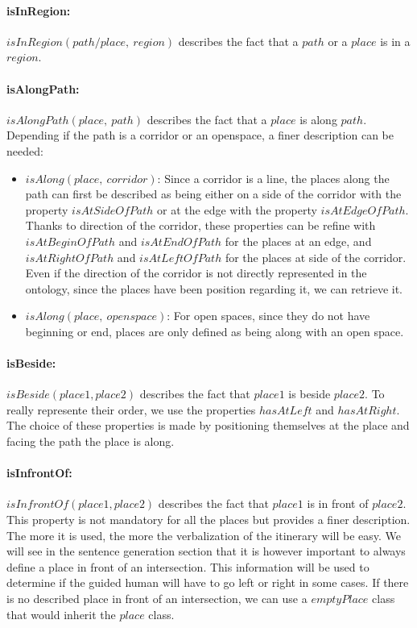 \paragraph{isInRegion:} $isInRegion(path/place,\ region)$ describes the fact that a $path$ or a $place$ is in a $region$.

\paragraph{isAlongPath:} $isAlongPath(place,\ path)$ describes the fact that a $place$ is along $path$. Depending if the path is a corridor or an openspace, a finer description can be needed:
\begin{itemize}
  
  \item $isAlong(place,\ corridor)$: Since a corridor is a line, the places along the path can first be described as being either on a side of the corridor with the property $isAtSideOfPath$ or at the edge with the property $isAtEdgeOfPath$. Thanks to direction of the corridor, these properties can be refine with $isAtBeginOfPath$ and $isAtEndOfPath$ for the places at an edge, and  $isAtRightOfPath$ and $isAtLeftOfPath$ for the places at side of the corridor. Even if the direction of the corridor is not directly represented in the ontology, since the places have been position regarding it, we can retrieve it.
  \item $isAlong(place,\ openspace)$: For open spaces, since they do not have beginning or end, places are only defined as being along with an open space.
\end{itemize}

\paragraph{isBeside:} $isBeside(place1,place2)$ describes the fact that $place1$ is beside $place2$. To really represente their order, we use the properties $hasAtLeft$ and $hasAtRight$. The choice of these properties is made by positioning themselves at the place and facing the path the place is along.

\paragraph{isInfrontOf:} $isInfrontOf(place1,place2)$ describes the fact that $place1$ is in front of $place2$. This property is not mandatory for all the places but provides a finer description. The more it is used, the more the verbalization of the itinerary will be easy. We will see in the sentence generation section that it is however important to always define a place in front of an intersection. This information will be used to determine if the guided human will have to go left or right in some cases. If there is no described place in front of an intersection, we can use a $emptyPlace$ class that would inherit the $place$ class.

